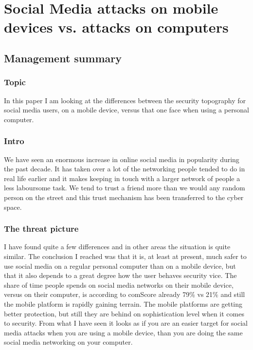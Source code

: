 \chapter[Social Media Attacks]{Social Media attacks on mobile devices vs. attacks on computers}
\section{Management summary}
\subsection*{Topic}
In this paper I am looking at the differences between the security topography for social media users, on a mobile device, versus that one face when using a personal computer.
\subsection*{Intro}
We have seen an enormous increase in online social media in popularity during the past decade. It has taken over a lot of the networking people tended to do in real life earlier and it makes keeping in touch with a larger network of people a less laboursome task. We tend to trust a friend more than we would any random person on the street and this trust mechanism has been transferred to the cyber space.
\subsection*{The threat picture}
I have found quite a few differences and in other areas the situation is quite similar. The conclusion I reached was that it is, at least at present, much safer to use social media on a regular personal computer than on a mobile device, but that it also depends to a great degree how the user behaves security vice. The share of time people spends on social media networks on their mobile device, versus on their computer, is according to comScore already 79\% vs 21\% and still the mobile platform is rapidly gaining terrain. The mobile platforms are getting better protection, but still they are behind on sophistication level when it comes to security. From what I have seen it looks as if you are an easier target for social media attacks when you are using a mobile device, than you are doing the same social media networking on your computer.
